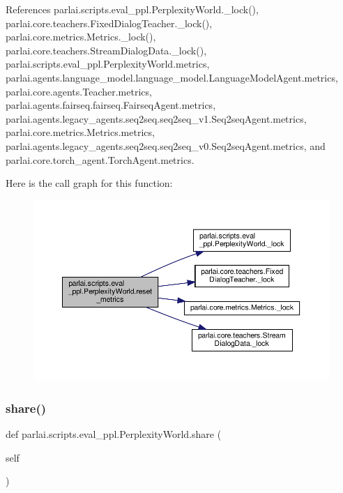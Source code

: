 References parlai.\+scripts.\+eval\+\_\+ppl.\+Perplexity\+World.\+\_\+lock(), parlai.\+core.\+teachers.\+Fixed\+Dialog\+Teacher.\+\_\+lock(), parlai.\+core.\+metrics.\+Metrics.\+\_\+lock(), parlai.\+core.\+teachers.\+Stream\+Dialog\+Data.\+\_\+lock(), parlai.\+scripts.\+eval\+\_\+ppl.\+Perplexity\+World.\+metrics, parlai.\+agents.\+language\+\_\+model.\+language\+\_\+model.\+Language\+Model\+Agent.\+metrics, parlai.\+core.\+agents.\+Teacher.\+metrics, parlai.\+agents.\+fairseq.\+fairseq.\+Fairseq\+Agent.\+metrics, parlai.\+agents.\+legacy\+\_\+agents.\+seq2seq.\+seq2seq\+\_\+v1.\+Seq2seq\+Agent.\+metrics, parlai.\+core.\+metrics.\+Metrics.\+metrics, parlai.\+agents.\+legacy\+\_\+agents.\+seq2seq.\+seq2seq\+\_\+v0.\+Seq2seq\+Agent.\+metrics, and parlai.\+core.\+torch\+\_\+agent.\+Torch\+Agent.\+metrics.

Here is the call graph for this function\+:
\nopagebreak
\begin{figure}[H]
\begin{center}
\leavevmode
\includegraphics[width=350pt]{classparlai_1_1scripts_1_1eval__ppl_1_1PerplexityWorld_a568271c275fbe3f911c1e437a04655cf_cgraph}
\end{center}
\end{figure}
\mbox{\label{classparlai_1_1scripts_1_1eval__ppl_1_1PerplexityWorld_a2326b854872d6df841070d9d8076a9ff}} 
\subsubsection{\texorpdfstring{share()}{share()}}
{\footnotesize\ttfamily def parlai.\+scripts.\+eval\+\_\+ppl.\+Perplexity\+World.\+share (\begin{DoxyParamCaption}\item[{}]{self }\end{DoxyParamCaption})}



